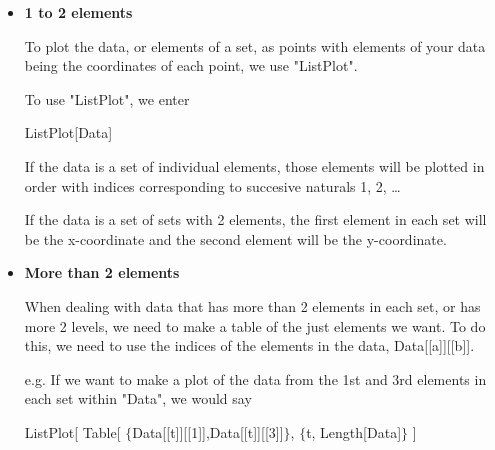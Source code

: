 \documentclass[11pt,letterpaper,twoside,titlepage]{report}
\begin{document}
				\begin{itemize}
			
					\item %
					
						\textbf{1 to 2 elements}
				
						To plot the data, or elements of a set, as points with elements of your data being the coordinates of each point, we use "ListPlot".
				
						To use "ListPlot", we enter
				
						\begin{center} ListPlot[Data] \end{center}
				
						If the data is a set of individual elements, those elements will be plotted in order with indices corresponding to succesive naturals 1, 2, \dots 
				
						If the data is a set of sets with 2 elements, the first element in each set will be the x-coordinate and the second element will be the y-coordinate.
						
					\item %
				
						\textbf{More than 2 elements}
						
						When dealing with data that has more than 2 elements in each set, or has more 2 levels, we need to make a table of the just elements we want.  To do this, we need to use the indices of the elements in the data, Data[[a]][[b]].
						
						e.g. If we want to make a plot of the data from the 1st and 3rd elements in each set within "Data", we would say
						
						\begin{center}
						
							ListPlot[
								Table[ $ \{ $Data[[t]][[1]],Data[[t]][[3]]$ \} $, $ \{ $t, Length[Data]$ \} $
							]
						
						\end{center}
						

\end{itemize}
\end{document}
